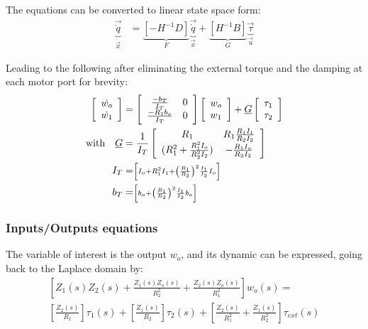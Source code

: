 The equations can be converted to linear state space form:
\begin{align}
\underbrace{ \vec{\ddot{q}} }_{\dot{\vec{x}}}
 &= 
\underbrace{ \left[ -H^{-1} D \right] }_{F}
\underbrace{ \vec{\dot{q}} }_{\vec{x}}
+ 
\underbrace{ \left[ H^{-1} B \right] }_{G}
\underbrace{ \vec{\tau} }_{\vec{u}}
\end{align}

Leading to the following after eliminating the external torque and the damping at each motor port for brevity:
\begin{align}
\left[
\begin{array}{c}
\dot{w_o}\\
\dot{w_1}
\end{array}
\right] &= 
\left[
\begin{array}{c c}
\frac{-b_T}{I_T} &   0 \\
\frac{-R_1 b_o}{I_T}  &  0 \\
\end{array}
\right]
\left[ \begin{array}{c}
w_o \\
w_1
\end{array} \right]+
\underline{G}
\left[ \begin{array}{c}
\tau_1 \\
\tau_2
\end{array} \right] 
\label{eq:ss}
\\
\text{with} \quad 
\underline{G} &= 
\frac{1}{I_T}
\left[
\begin{array}{c c}
 R_1  &   R_1 \frac{R_1 I_1}{R_2 I_2}  \\
(R_1^2+\frac{R_1^2 I_o}{R_2^2 I_2})  &  - \frac{R_1 I_o}{R_2 I_2} \\
\end{array}
\right] \\
 I_T &=  \scriptstyle \left[   I_o + R_1^2 I_1 + \left( \frac{R_1}{R_2} \right)^2 \frac{I_1}{I_2} I_o \right]\\
 b_T &= \scriptstyle \left[ b_o + \left( \frac{R_1}{R_2} \right)^2 \frac{I_1}{I_2} b_o \right] 
\end{align}
%


\subsubsection{Inputs/Outputs equations}
\label{sec:out}

The variable of interest is the output $w_o$, and its dynamic can be expressed, going back to the Laplace domain by:
%
\begin{align}
\left[
 Z_1(s) Z_2(s) + \frac{Z_1(s) Z_o(s)}{R_2^2} + \frac{Z_2(s) Z_o(s)}{R_1^2}
\right] w_o(s) = \\
\left[
 \frac{Z_2(s)}{R_1}
\right] \tau_1(s)  + 
\left[
 \frac{Z_1(s)}{R_2}
\right] \tau_2(s)  + 
\left[
 \frac{Z_2(s)}{R_1^2} + \frac{Z_1(s) }{R_2^2}
\right] \tau_{ext}(s)
\label{eq:dsdm_output}
\end{align}

